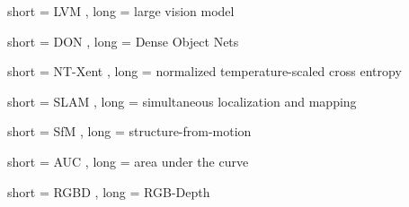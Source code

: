 {
	short = LVM ,
	long = large vision model
}

{
	short = DON ,
	long = Dense Object Nets
}

{
	short = NT-Xent ,
	long = normalized temperature-scaled cross entropy
}

{
	short = SLAM ,
	long = simultaneous localization and mapping 
}

{
	short = SfM ,
	long = structure-from-motion
}

{
	short = AUC ,
	long = area under the curve
}

{
	short = RGBD ,
	long = RGB-Depth 
}

